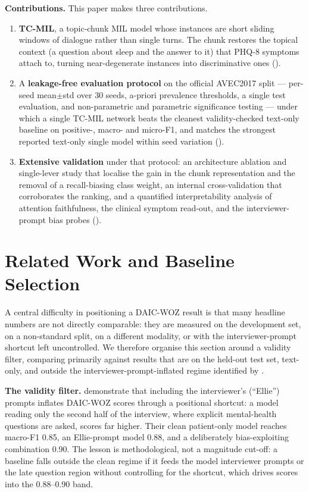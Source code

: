 \documentclass[conference]{IEEEtran}
\begin{document}
\textbf{Contributions.} This paper makes three contributions.
\begin{enumerate}
\item \textbf{TC-MIL}, a topic-chunk MIL model whose instances are short
sliding windows of dialogue rather than single turns. The chunk restores the
topical context (a question about sleep and the answer to it) that PHQ-8
symptoms attach to, turning near-degenerate instances into discriminative
ones ().
\item A \textbf{leakage-free evaluation protocol} on the official AVEC2017
split --- per-seed mean$\pm$std over 30 seeds, a-priori prevalence thresholds, a
single test evaluation, and non-parametric and parametric significance testing
--- under which a single TC-MIL network beats the cleanest validity-checked
text-only baseline on positive-, macro- and micro-F1, and matches the
strongest reported text-only single model within seed variation
().
\item \textbf{Extensive validation} under that protocol: an architecture
ablation and single-lever study that localise the gain in the chunk
representation and the removal of a recall-biasing class weight, an internal
cross-validation that corroborates the ranking, and a quantified
interpretability analysis of attention faithfulness, the clinical symptom
read-out, and the interviewer-prompt bias probes
().
\end{enumerate}

\section{Related Work and Baseline Selection}
\label{sec:related}

A central difficulty in positioning a DAIC-WOZ result is that many headline
numbers are not directly comparable: they are measured on the development set, on a
non-standard split, on a different modality, or with the interviewer-prompt
shortcut left uncontrolled. We therefore organise this section around a validity
filter, comparing primarily against results that are on the held-out test set,
text-only, and outside the interviewer-prompt-inflated regime identified by
\cite{burdisso2024}.

\textbf{The validity filter.} \cite{burdisso2024} demonstrate
that including the interviewer's (``Ellie'') prompts inflates DAIC-WOZ scores
through a positional shortcut: a model reading only the second half of the
interview, where explicit mental-health questions are asked, scores far higher.
Their clean patient-only model reaches macro-F1 0.85, an Ellie-prompt model
0.88, and a deliberately bias-exploiting combination 0.90. The lesson is
methodological, not a magnitude cut-off: a baseline falls outside the clean
regime if it feeds the model interviewer prompts or the late question region
without controlling for the shortcut, which drives scores into the 0.88--0.90 band.
\end{document}
